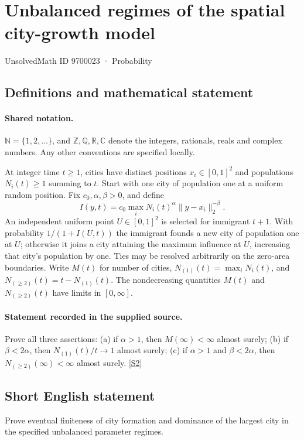 \documentclass[11pt]{article}
\newcommand{\sref}[2]{\hyperlink{source:#1:#2}{[S#2]}}
\begin{document}
\setcounter{section}{9700022}
\section{Unbalanced regimes of the spatial city-growth model}\label{9700023}
{\small\sffamily UnsolvedMath ID 9700023 · Probability}
\subsection{Definitions and mathematical statement}

\paragraph{Shared notation.}$\mathbb N=\{1,2,\ldots\}$, and $\mathbb Z,\mathbb Q,\mathbb R,\mathbb C$ denote the integers, rationals, reals and complex numbers. Any other conventions are specified locally.


At integer time $t\ge1$, cities have distinct positions $x_i\in[0,1]^2$ and populations $N_i(t)\ge1$ summing to $t$. Start with one city of population one at a uniform random position. Fix $c_0,\alpha,\beta>0$, and define
\[I(y,t)=c_0\max_i N_i(t)^\alpha\|y-x_i\|_2^{-\beta}.\]
An independent uniform point $U\in[0,1]^2$ is selected for immigrant $t+1$. With probability $1/(1+I(U,t))$ the immigrant founds a new city of population one at $U$; otherwise it joins a city attaining the maximum influence at $U$, increasing that city's population by one. Ties may be resolved arbitrarily on the zero-area boundaries. Write $M(t)$ for number of cities, $N_{(1)}(t)=\max_iN_i(t)$, and $N_{(\ge2)}(t)=t-N_{(1)}(t)$. The nondecreasing quantities $M(t)$ and $N_{(\ge2)}(t)$ have limits in $[0,\infty]$.
\paragraph{Statement recorded in the supplied source.}
Prove all three assertions: (a) if $\alpha>1$, then $M(\infty)<\infty$ almost surely; (b) if $\beta<2\alpha$, then $N_{(1)}(t)/t\to1$ almost surely; (c) if $\alpha>1$ and $\beta<2\alpha$, then $N_{(\ge2)}(\infty)<\infty$ almost surely. \sref{9700023}{2}
\subsection{Short English statement}
Prove eventual finiteness of city formation and dominance of the largest city in the specified unbalanced parameter regimes.
\end{document}
